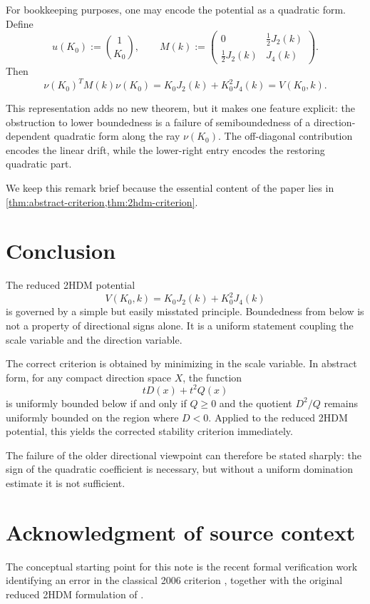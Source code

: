 \documentclass[11pt,a4paper]{article}
\theoremstyle{definition}
\theoremstyle{remark}
\begin{document}
For bookkeeping purposes, one may encode the potential as a quadratic form. Define
\[
u(K_0):=\binom{1}{K_0},
\qquad
M(k):=
\begin{pmatrix}
0 & \tfrac12 J_2(k)\\[1ex]
\tfrac12 J_2(k) & J_4(k)
\end{pmatrix}.
\]
Then
\[
\nu(K_0)^TM(k)\nu(K_0)=K_0J_2(k)+K_0^2J_4(k)=V(K_0,k).
\]

This representation adds no new theorem, but it makes one feature explicit: the obstruction to lower boundedness is a failure of semiboundedness of a direction-dependent quadratic form along the ray $\nu(K_0)$. The off-diagonal contribution encodes the linear drift, while the lower-right entry encodes the restoring quadratic part.

We keep this remark brief because the essential content of the paper lies in \cref{thm:abstract-criterion,thm:2hdm-criterion}.

\section{Conclusion}

The reduced 2HDM potential
\[
V(K_0,k)=K_0J_2(k)+K_0^2J_4(k)
\]
is governed by a simple but easily misstated principle. Boundedness from below is not a property of directional signs alone. It is a uniform statement coupling the scale variable and the direction variable.

The correct criterion is obtained by minimizing in the scale variable. In abstract form, for any compact direction space $X$, the function
\[
tD(x)+t^2Q(x)
\]
is uniformly bounded below if and only if $Q\ge0$ and the quotient $D^2/Q$ remains uniformly bounded on the region where $D<0$. Applied to the reduced 2HDM potential, this yields the corrected stability criterion immediately.

The failure of the older directional viewpoint can therefore be stated sharply: the sign of the quadratic coefficient is necessary, but without a uniform domination estimate it is not sufficient.

\section*{Acknowledgment of source context}
The conceptual starting point for this note is the recent formal verification work identifying an error in the classical 2006 criterion \citep{ToobySmith2026}, together with the original reduced 2HDM formulation of \citet{Maniatis2006}.



\end{document}
